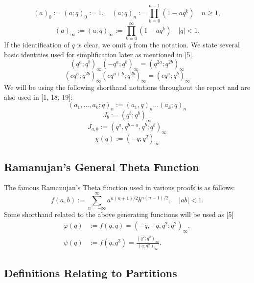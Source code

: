 \begin{equation*}
    (a)_0 := (a;q)_0 := 1, \quad (a; q)_n := \prod_{k=0}^{n-1} (1- aq^k) \quad n \geq 1,
\end{equation*}
\begin{equation*}
    (a)_\infty := (a;q)_\infty := \prod_{k=0}^{\infty} (1- aq^k) \quad |q| < 1.
\end{equation*}
If the identification of $q$ is clear, we omit $q$ from the notation.
We state several basic identities used for simplification later as mentioned in [5].
\begin{equation}
    (q^a;q^b)_\infty(-q^a;q^b)_\infty = (q^{2a};q^{2b})_\infty
\end{equation}
\begin{equation}
    (cq^a;q^{2b})_\infty(cq^{a+b};q^{2b})_\infty = (cq^a;q^b)_\infty
\end{equation}
We will be using the following shorthand notations throughout the report and are also used in [1, 18, 19]:
\begin{equation*}
    (a_1,...,a_k;q)_n := (a_1,q)_n...(a_k;q)_n
\end{equation*}
\begin{equation*}
    J_b := (q^b;q^b)_\infty
\end{equation*}
\begin{equation*}
    J_{a,b} := (q^a,q^{b-a},q^b;q^b)_\infty
\end{equation*}
\begin{equation*}
    \chi(q) := (-q;q^2)_\infty
\end{equation*}
\subsection{Ramanujan's General Theta Function}
The famous Ramanujan's Theta function used in various proofs is as follows:
\begin{equation}
    f(a, b) := \sum_{n = -\infty}^\infty a^{n(n+1)/2}b^{n(n-1)/2}, \quad |ab| < 1.
\end{equation}
Some shorthand related to the above generating functions will be used as [5]
\begin{align*}
    \varphi(q) &:= f(q,q) = (-q,-q,q^2;q^2)_\infty,
    \\ \psi(q) &:= f(q,q^3) = \frac{(q^2;q^2)_\infty}{(q;q^2)_\infty}.
\end{align*}

\subsection{Definitions Relating to Partitions}
